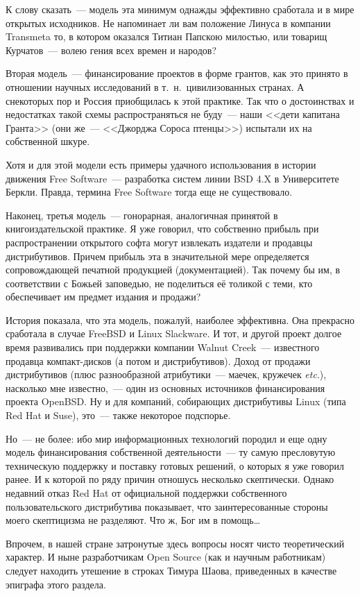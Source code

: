 К слову сказать~--- модель эта минимум однажды эффективно сработала и в мире открытых исходников. Не напоминает ли вам положение Линуса в компании Transmeta то, в котором оказался Титиан Папскою милостью, или товарищ Курчатов~--- волею гения всех времен и народов?

Вторая модель~--- финансирование проектов в форме грантов, как это принято в отношении научных исследований в т.~н.~цивилизованных странах. А снекоторых пор и Россия приобщилась к этой практике. Так что о достоинствах и недостатках такой схемы распространяться не буду~--- наши <<дети капитана Гранта>> (они же~--- <<Джорджа Сороса птенцы>>) испытали их на собственной шкуре.

Хотя и для этой модели есть примеры удачного использования в истории движения Free Software~--- разработка систем линии BSD 4.X в Университете Беркли. Правда, термина Free Software тогда еще не существовало.

Наконец, третья модель~--- гонорарная, аналогичная принятой в книгоиздательской практике. Я уже говорил, что собственно прибыль при распространении открытого софта могут извлекать издатели и продавцы дистрибутивов. Причем прибыль эта в значительной мере определяется сопровождающей печатной продукцией (документацией). Так почему бы им, в соответствии с Божьей заповедью, не поделиться её толикой с теми, кто обеспечивает им предмет издания и продажи?

История показала, что эта модель, пожалуй, наиболее эффективна. Она прекрасно сработала в случае FreeBSD и Linux Slackware. И тот, и другой проект долгое время развивались при поддержки компании Walnut Creek~--- известного продавца компакт-дисков (а потом и дистрибутивов). Доход от продажи дистрибутивов (плюс разнообразной атрибутики~--- маечек, кружечек \textit{etc}.), насколько мне известно,~--- один из основных источников финансирования проекта OpenBSD. Ну и для компаний, собирающих дистрибутивы Linux (типа Red Hat и Suse), это~--- также некоторое подспорье.

Но~--- не более: ибо мир информационных технологий породил и еще одну модель финансирования собственной деятельности~--- ту самую пресловутую техническую поддержку и поставку готовых решений, о которых я уже говорил ранее. И к которой по ряду причин отношусь несколько скептически. Однако недавний отказ Red Hat от официальной поддержки собственного пользовательского дистрибутива показывает, что заинтересованные стороны моего скептицизма не разделяют. Что ж, Бог им в помощь\dots

Впрочем, в нашей стране затронутые здесь вопросы носят чисто теоретический характер. И ныне разработчикам Open Source (как и научным работникам) следует находить утешение в строках Тимура Шаова, приведенных в качестве эпиграфа этого раздела.


